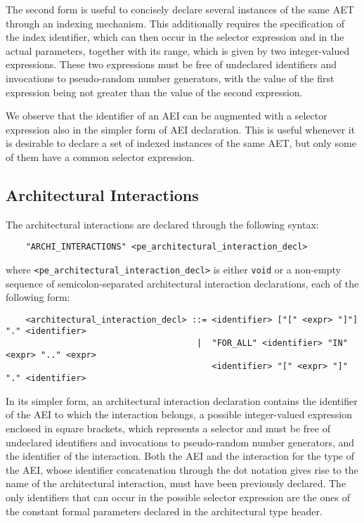 The second form is useful to concisely declare several instances of the same AET through an indexing
mechanism. This additionally requires the specification of the index identifier, which can then occur in the
selector expression and in the actual parameters, together with its range, which is given by two
integer-valued expressions. These two expressions must be free of undeclared identifiers and invocations to
pseudo-random number generators, with the value of the first expression being not greater than the value of
the second expression.

We observe that the identifier of an AEI can be augmented with a selector expression also in the simpler
form of AEI declaration. This is useful whenever it is desirable to declare a set of indexed instances of
the same AET, but only some of them have a common selector expression.


\subsection{Architectural Interactions}

The architectural interactions are declared through the following syntax:

	\begin{verbatim}
    "ARCHI_INTERACTIONS" <pe_architectural_interaction_decl>
	\end{verbatim}

\noindent where {\tt <pe\_architectural\_interaction\_decl>} is either {\tt void} or a non-empty sequence of
semicolon-separated architectural interaction declarations, each of the following form:

	\begin{verbatim}
    <architectural_interaction_decl> ::= <identifier> ["[" <expr> "]"] "." <identifier>
                                      |  "FOR_ALL" <identifier> "IN" <expr> ".." <expr>
                                         <identifier> "[" <expr> "]" "." <identifier>
	\end{verbatim}

In its simpler form, an architectural interaction declaration contains the identifier of the AEI to which
the interaction belongs, a possible integer-valued expression enclosed in square brackets, which represents
a selector and must be free of undeclared identifiers and invocations to pseudo-random number generators,
and the identifier of the interaction. Both the AEI and the interaction for the type of the AEI, whose
identifier concatenation through the dot notation gives rise to the name of the architectural interaction,
must have been previously declared. The only identifiers that can occur in the possible selector expression
are the ones of the constant formal parameters declared in the architectural type header.

